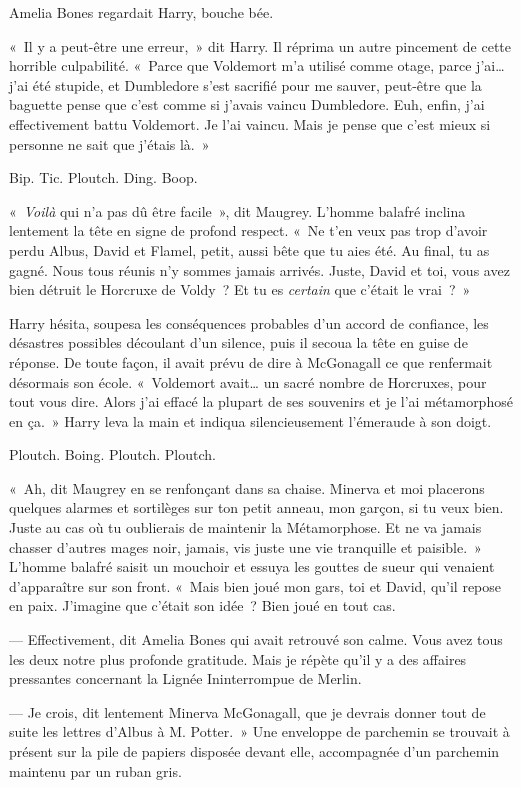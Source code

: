 Amelia Bones regardait Harry, bouche bée.

«~Il y a peut-être une erreur,~» dit Harry.
Il réprima un autre pincement de cette horrible culpabilité.
«~Parce que Voldemort m'a utilisé comme otage, parce j'ai… j'ai été stupide, et Dumbledore s'est sacrifié pour me sauver, peut-être que la baguette pense que c'est comme si j'avais vaincu Dumbledore.
Euh, enfin, j'ai effectivement battu Voldemort.
Je l'ai vaincu.
Mais je pense que c'est mieux si personne ne sait que j'étais là.~»

Bip. Tic.
Ploutch.
Ding. Boop.

«~\emph{Voilà} qui n'a pas dû être facile~», dit Maugrey.
L'homme balafré inclina lentement la tête en signe de profond respect.
«~Ne t'en veux pas trop d'avoir perdu Albus, David et Flamel, petit, aussi bête que tu aies été.
Au final, tu as gagné.
Nous tous réunis n'y sommes jamais arrivés.
Juste, David et toi, vous avez bien détruit le Horcruxe de Voldy~?
Et tu es \emph{certain} que c'était le vrai~?~»

Harry hésita, soupesa les conséquences probables d'un accord de confiance, les désastres possibles découlant d'un silence, puis il secoua la tête en guise de réponse.
De toute façon, il avait prévu de dire à McGonagall ce que renfermait désormais son école.
«~Voldemort avait… un sacré nombre de Horcruxes, pour tout vous dire.
Alors j'ai effacé la plupart de ses souvenirs et je l'ai métamorphosé en ça.~»
Harry leva la main et indiqua silencieusement l'émeraude à son doigt.

Ploutch.
Boing. Ploutch.
Ploutch.

«~Ah, dit Maugrey en se renfonçant dans sa chaise.
Minerva et moi placerons quelques alarmes et sortilèges sur ton petit anneau, mon garçon, si tu veux bien.
Juste au cas où tu oublierais de maintenir la Métamorphose.
Et ne va jamais chasser d'autres mages noir, jamais, vis juste une vie tranquille et paisible.~»
L'homme balafré saisit un mouchoir et essuya les gouttes de sueur qui venaient d'apparaître sur son front.
«~Mais bien joué mon gars, toi et David, qu'il repose en paix.
J'imagine que c'était son idée~?
Bien joué en tout cas.

--- Effectivement, dit Amelia Bones qui avait retrouvé son calme.
Vous avez tous les deux notre plus profonde gratitude.
Mais je répète qu'il y a des affaires pressantes concernant la Lignée Ininterrompue de Merlin.

--- Je crois, dit lentement Minerva McGonagall, que je devrais donner tout de suite les lettres d'Albus à M. Potter.~»
Une enveloppe de parchemin se trouvait à présent sur la pile de papiers disposée devant elle, accompagnée d'un parchemin maintenu par un ruban gris.


